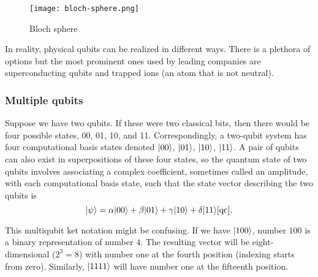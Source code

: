 \begin{figure}[H]
    \begin{center}
       \texttt{[image: bloch-sphere.png]}
       \caption{Bloch sphere \cite{bloch_sphere}}
    \end{center}
\end{figure} 


In reality, physical qubits can be realized in different ways. There is a plethora of options but the most prominent ones used by leading companies are superconducting qubits and trapped ions (an atom that is not neutral).

\subsubsection{Multiple qubits}
Suppose we have two qubits. If these were two classical bits, then there would be four possible states, 00, 01, 10, and 11. Correspondingly, a two-qubit system has four computational basis states denoted $\lvert00\rangle$, $\lvert01\rangle$, $\lvert10\rangle$, $\lvert11\rangle$. A pair of qubits can also exist in superpositions of these four states, so the quantum state of two qubits involves associating a complex coefficient, sometimes called an amplitude, with each computational basis state, such that the state vector describing the two qubits is
$$\lvert\psi\rangle = \alpha \lvert00\rangle + \beta \lvert01\rangle + \gamma \lvert10\rangle + \delta \lvert11\rangle\cite{qc}\text{.}$$

This multiqubit ket notation might be confusing. If we have $\lvert100\rangle$, number $100$ is a binary representation of number $4$. The resulting vector will be eight-dimensional ($2^3 = 8$) with number one at the fourth position (indexing starts from zero). Similarly, $\lvert1111\rangle$ will have number one at the fifteenth position.
